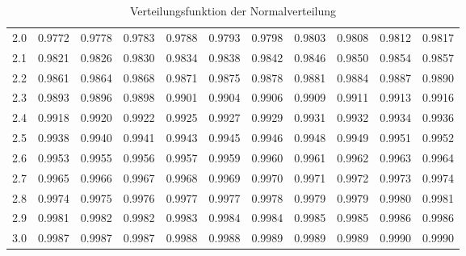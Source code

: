 \begin{table}[h]
\begin{center}
\begin{tabular}{|r|rrrrrrrrrr|}
2.0&0.9772&0.9778&0.9783&0.9788&0.9793&0.9798&0.9803&0.9808&0.9812&0.9817\\
2.1&0.9821&0.9826&0.9830&0.9834&0.9838&0.9842&0.9846&0.9850&0.9854&0.9857\\
2.2&0.9861&0.9864&0.9868&0.9871&0.9875&0.9878&0.9881&0.9884&0.9887&0.9890\\
2.3&0.9893&0.9896&0.9898&0.9901&0.9904&0.9906&0.9909&0.9911&0.9913&0.9916\\
2.4&0.9918&0.9920&0.9922&0.9925&0.9927&0.9929&0.9931&0.9932&0.9934&0.9936\\
2.5&0.9938&0.9940&0.9941&0.9943&0.9945&0.9946&0.9948&0.9949&0.9951&0.9952\\
2.6&0.9953&0.9955&0.9956&0.9957&0.9959&0.9960&0.9961&0.9962&0.9963&0.9964\\
2.7&0.9965&0.9966&0.9967&0.9968&0.9969&0.9970&0.9971&0.9972&0.9973&0.9974\\
2.8&0.9974&0.9975&0.9976&0.9977&0.9977&0.9978&0.9979&0.9979&0.9980&0.9981\\
2.9&0.9981&0.9982&0.9982&0.9983&0.9984&0.9984&0.9985&0.9985&0.9986&0.9986\\
3.0&0.9987&0.9987&0.9987&0.9988&0.9988&0.9989&0.9989&0.9989&0.9990&0.9990\\
\hline
\end{tabular}
\end{center}
\caption{Verteilungsfunktion der Normalverteilung\label{tabelle-Fnormalverteilung}
}
\end{table}

